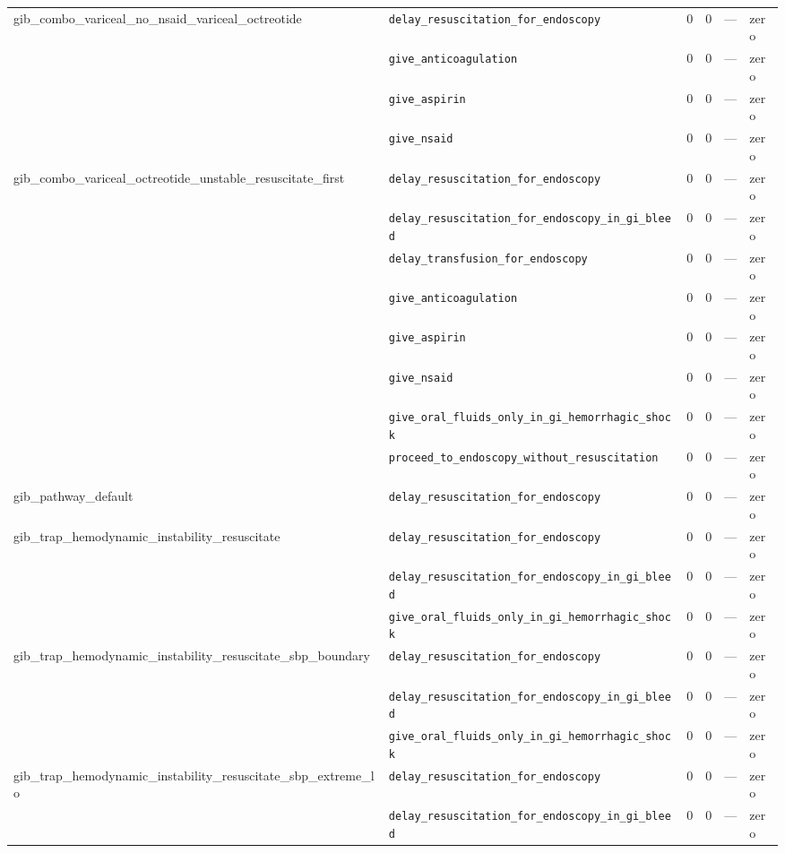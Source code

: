 \begin{table}[ht]
\begin{tabular}{llrrrl}
\midrule
gib\_combo\_variceal\_no\_nsaid\_variceal\_octreotide & \texttt{delay\_resuscitation\_for\_endoscopy} & 0 & 0 & — & zero \\
 & \texttt{give\_anticoagulation} & 0 & 0 & — & zero \\
 & \texttt{give\_aspirin} & 0 & 0 & — & zero \\
 & \texttt{give\_nsaid} & 0 & 0 & — & zero \\
\midrule
gib\_combo\_variceal\_octreotide\_unstable\_resuscitate\_first & \texttt{delay\_resuscitation\_for\_endoscopy} & 0 & 0 & — & zero \\
 & \texttt{delay\_resuscitation\_for\_endoscopy\_in\_gi\_bleed} & 0 & 0 & — & zero \\
 & \texttt{delay\_transfusion\_for\_endoscopy} & 0 & 0 & — & zero \\
 & \texttt{give\_anticoagulation} & 0 & 0 & — & zero \\
 & \texttt{give\_aspirin} & 0 & 0 & — & zero \\
 & \texttt{give\_nsaid} & 0 & 0 & — & zero \\
 & \texttt{give\_oral\_fluids\_only\_in\_gi\_hemorrhagic\_shock} & 0 & 0 & — & zero \\
 & \texttt{proceed\_to\_endoscopy\_without\_resuscitation} & 0 & 0 & — & zero \\
\midrule
gib\_pathway\_default & \texttt{delay\_resuscitation\_for\_endoscopy} & 0 & 0 & — & zero \\
\midrule
gib\_trap\_hemodynamic\_instability\_resuscitate & \texttt{delay\_resuscitation\_for\_endoscopy} & 0 & 0 & — & zero \\
 & \texttt{delay\_resuscitation\_for\_endoscopy\_in\_gi\_bleed} & 0 & 0 & — & zero \\
 & \texttt{give\_oral\_fluids\_only\_in\_gi\_hemorrhagic\_shock} & 0 & 0 & — & zero \\
\midrule
gib\_trap\_hemodynamic\_instability\_resuscitate\_sbp\_boundary & \texttt{delay\_resuscitation\_for\_endoscopy} & 0 & 0 & — & zero \\
 & \texttt{delay\_resuscitation\_for\_endoscopy\_in\_gi\_bleed} & 0 & 0 & — & zero \\
 & \texttt{give\_oral\_fluids\_only\_in\_gi\_hemorrhagic\_shock} & 0 & 0 & — & zero \\
\midrule
gib\_trap\_hemodynamic\_instability\_resuscitate\_sbp\_extreme\_lo & \texttt{delay\_resuscitation\_for\_endoscopy} & 0 & 0 & — & zero \\
 & \texttt{delay\_resuscitation\_for\_endoscopy\_in\_gi\_bleed} & 0 & 0 & — & zero \\

\end{tabular}
\end{table}
